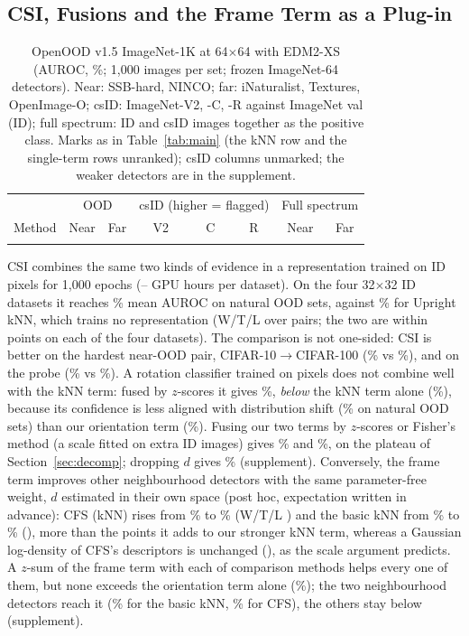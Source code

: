 \documentclass{article}
\begin{document}
\subsection{CSI, Fusions and the Frame Term as a Plug-in}
\label{sec:fusion}
\begin{table}[tb]\centering\footnotesize\setlength{\tabcolsep}{2.6pt}\renewcommand{\arraystretch}{0.92}
\begin{tabular}{@{}lcc|ccc|cc@{}}\toprule
 & \multicolumn{2}{c|}{OOD} & \multicolumn{3}{c|}{csID (higher = flagged)} & \multicolumn{2}{c}{Full spectrum}\\
Method & Near & Far & V2 & C & R & Near & Far\\\midrule
{}{tab_imagenet.tex}
\bottomrule
\end{tabular}
\caption{OpenOOD v1.5 ImageNet-1K at 64$\times$64 with EDM2-XS (AUROC, \%; 1{,}000 images per set; frozen ImageNet-64 detectors). Near: SSB-hard, NINCO; far: iNaturalist, Textures, OpenImage-O; csID: ImageNet-V2, -C, -R against ImageNet val (ID); full spectrum: ID and csID images together as the positive class. Marks as in Table~\ref{tab:main} (the kNN row and the single-term rows unranked); csID columns unmarked; the weaker detectors are in the supplement.}
\label{tab:imagenet}
\end{table}
CSI combines the same two kinds of evidence in a representation trained on ID pixels for 1{,}000 epochs (\csiHoursMin--\csiHoursMax{} GPU hours per dataset). On the four 32$\times$32 ID datasets it reaches \csiMean\% mean AUROC on natural OOD sets, against \csiOursMean\% for Upright kNN, which trains no representation (W/T/L \csiWtl{} over \csiNatPairs{} pairs; the two are within \csiCloseMaxGap{} points on each of the four datasets). The comparison is not one-sided: CSI is better on the hardest near-OOD pair, CIFAR-10$\to$CIFAR-100 (\csiCtenCh\% vs \pCtenCh\%), and on the probe (\csiVfMean\% vs \csiOursVfMean\%). A rotation classifier trained on pixels does not combine well with the kNN term: fused by $z$-scores it gives \fuRZ\%, \emph{below} the kNN term alone (\contentMean\%), because its confidence is less aligned with distribution shift (\rotMean\% on natural OOD sets) than our orientation term (\poseMean\%). Fusing our two terms by $z$-scores or Fisher's method (a scale fitted on extra ID images) gives \fuOZ\% and \fuOF\%, on the plateau of Section~\ref{sec:decomp}; dropping $d$ gives \fuDO\% (supplement). Conversely, the frame term improves other neighbourhood detectors with the same parameter-free weight, $d$ estimated in their own space (post hoc, expectation written in advance): CFS (kNN) rises from \eNineCfsKnn\% to \eNineUpCfsKnn\% (W/T/L \eNineCfsKnnWtl) and the basic kNN from \eNineKnnB\% to \eNineUpKnnB\% (\eNineKnnBWtl), more than the \gainKnnTNat{} points it adds to our stronger kNN term, whereas a Gaussian log-density of CFS's descriptors is unchanged (\eNineGainCfsDiag), as the scale argument predicts. A $z$-sum of the frame term with each of \eNineZn{} comparison methods helps every one of them, but none exceeds the orientation term alone (\poseMean\%); the two neighbourhood detectors reach it (\eNineZKnnB\% for the basic kNN, \eNineZCfsKnn\% for CFS), the others stay below (supplement).
\end{document}
